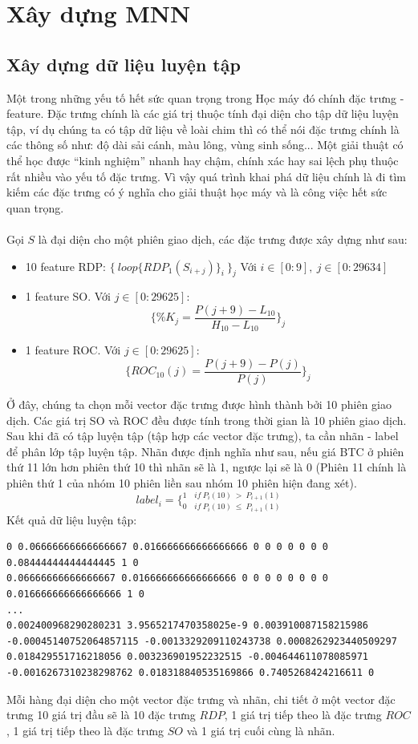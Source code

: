 \section{Xây dựng MNN}
\subsection{Xây dựng dữ liệu luyện tập}
Một trong những yếu tố hết sức quan trọng trong Học máy đó chính đặc trưng 
- feature. Đặc trưng chính là các giá trị thuộc tính đại diện cho tập dữ liệu 
luyện tập, ví dụ chúng ta có tập dữ liệu về loài chim thì có thể nói đặc trưng 
chính là các thông số như: độ dài sải cánh, màu lông, vùng sinh sống... Một 
giải thuật có thể học được ``kinh nghiệm'' nhanh hay chậm, chính xác hay sai lệch 
phụ thuộc rất nhiều vào yếu tố đặc trưng. Vì vậy quá trình khai phá dữ liệu 
chính là đi tìm kiếm các đặc trưng có ý nghĩa cho giải thuật học máy và là 
công việc hết sức quan trọng.\\\\
Gọi $S$ là đại diện cho một phiên giao dịch, các đặc trưng được xây dựng như 
sau:
\begin{itemize}
    \item 10 feature RDP: $\{ \: loop\{ RDP_1(S_{i+j})\}_i \: \}_j$ Với 
    $i \in [0:9], \: j \in [0:29634]$
    \item 1 feature SO. Với $ j \in [0:29625] $:\\
    \[
        \{ \%K_j = \frac{P(j+9)-L_{10}}{H_{10}-L_{10}} \}_j
    \]
    \item 1 feature ROC. Với $ j \in [0:29625] $:\\ 
    \[
        \{ ROC_{10}(j)= \frac{P(j+9) - P(j)}{P(j)} \}_j
    \]
\end{itemize}
Ở đây, chúng ta chọn mỗi vector đặc trưng được hình thành bởi 10 phiên giao 
dịch. Các giá trị SO và ROC đều được tính trong thời gian là 10 phiên giao dịch.
Sau khi đã có tập luyện tập (tập hợp các vector đặc trưng), ta cần nhãn - label 
để phân lớp tập luyện tập. Nhãn được định nghĩa như sau, nếu giá BTC ở phiên 
thứ 11 lớn hơn phiên thứ 10 thì nhãn sẽ là 1, ngược lại sẽ là 0 (Phiên 11 chính 
là phiên thứ 1 của nhóm 10 phiên liền sau nhóm 10 phiên hiện đang xét).\\
\[
    label_i = \bigg \{ _{0 \quad if \: P_i(10) \: \leq \: P_{i+1}(1)} ^{1 \quad if \: P_i(10) \: > \: P_{i+1}(1)}
\]
Kết quả dữ liệu luyện tập:
\begin{lstlisting}
0 0.06666666666666667 0.016666666666666666 0 0 0 0 0 0 0 0.08444444444444445 1 0
0.06666666666666667 0.016666666666666666 0 0 0 0 0 0 0 0 0.016666666666666666 1 0
...
0.002400968290280231 3.9565217470358025e-9 0.003910087158215986 -0.00045140752064857115 -0.0013329209110243738 0.0008262923440509297 0.018429551716218056 0.003236901952232515 -0.004644611078085971 -0.0016267310238298762 0.018318840535169866 0.7405268424216611 0
\end{lstlisting}
Mỗi hàng đại diện cho một vector đặc trưng và nhãn, chi tiết ở một vector đặc 
trưng 10 giá trị đầu sẽ là 10 đặc trưng $RDP$, 1 giá trị tiếp theo là đặc trưng 
$ROC$, 1 giá trị tiếp theo là đặc trưng $SO$ và 1 giá trị cuối cùng là nhãn.
